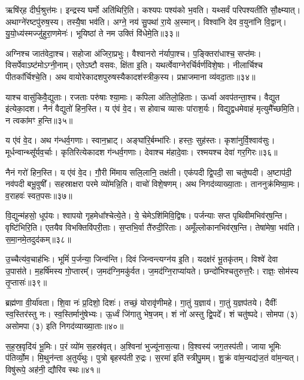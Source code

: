 ऋषि॑र्‌ह दीर्घ॒श्रुत्त॑मः। इन्द्रस्य घर्मो अति॑थिरि॒ति। 
कश्यपः पश्य॑को भ॒वति। यथ्सर्वं परिपश्यती॑ति सौ॒क्ष्म्यात्। 
अथाग्ने॑रष्टपु॑रुष॒स्य। तस्यै॒षा भव॑ति। 
अग्ने॒ नय॑ सु॒पथा॑ रा॒ये अ॒स्मान्। विश्वा॑नि देव व॒युना॑नि वि॒द्वान्। 
यु॒यो॒ध्य॑स्मज्जु॑हुरा॒णमेनः॑। भूयिष्ठां ते नम उक्तिं वि॑धेमे॒ति॥३३॥\anuvakamend


अग्निश्च जात॑वेदा॒श्च। सहोजा अ॑जिरा॒प्रभुः। वैश्वानरो न॑र्यापा॒श्च। 
प॒ङ्क्तिरा॑धाश्च॒ सप्त॑मः। विसर्पेवाऽष्ट॑मोऽग्नी॒नाम्। 
एतेऽष्टौ वसवः, क्षि॑ता इ॒ति। यथर्त्वेवाग्नेरर्चिर्वर्ण॑विशे॒षाः। 
नीलार्चिश्च पीतका᳚र्चिश्चे॒ति। अथ वायोरेकादशपुरुषस्यैका\-दश॑स्त्रीक॒स्य। 
प्रभ्राजमाना व्य॑वदा॒ताः॥३४॥


याश्च वासु॑किवै॒द्युताः। रजताः परु॑षाः श्या॒माः। कपिला अ॑तिलो॒हिताः। 
ऊर्ध्वा अवप॑तन्ता॒श्च। वैद्युत इ॑त्येका॒दश। नैनं वैद्युतो॑ हिन॒स्ति। 
य ए॑वं वे॒द। स होवाच व्यासः पा॑राश॒र्यः। 
विद्युद्वधमेवाहं मृत्युमै᳚च्छमि॒ति। न त्वका॑मꣳ ह॒न्ति॥३५॥


य ए॑वं वे॒द। अथ ग॑न्धर्व॒गणाः। स्वान॒भ्राट्। 
अङ्घा॑रि॒र्बम्भा॑रिः। हस्तः॒ सुह॑स्तः। कृशा॑नुर्वि॒श्वाव॑सुः। 
मूर्धन्वान्थ्सू᳚र्यव॒र्चाः। कृतिरित्येका\-दश ग॑न्धर्व॒\-गणाः। 
देवाश्च म॑हादे॒वाः। रश्मयश्च देवा॑ गर॒गिरः॥३६॥


नैनं गरो॑ हिन॒स्ति। य ए॑वं वे॒द। 
गौ॒री मि॑माय सलि॒लानि॒ तक्ष॑ती। एक॑पदी द्वि॒पदी॒ सा चतु॑ष्पदी। 
अ॒ष्टाप॑दी॒ नव॑पदी बभू॒वुषी᳚। सहस्राक्षरा परमे व्यो॑मन्नि॒ति। 
वाचो॑ विशे॒षणम्। अथ निगद॑व्याख्या॒ताः। 
ताननुक्र॑मिष्या॒मः। व॒राहवः॑ स्वत॒पसः॥३७॥

वि॒द्युन्म॑हसो॒ धूप॑यः। श्वापयो गृहमेधा᳚श्चेत्ये॒ते। 
ये॒ चेमे\-ऽ\-शि॑मिवि॒\-द्विषः। पर्जन्याः सप्त पृथिवीमभिव॑र्‌ष॒न्ति। 
वृष्टि॑भिरि॒ति। एतयैव विभक्तिवि॑परी॒ताः। स॒प्तभि॒र्वा तै॑रुदी॒रिताः। 
अमूँल्लोकान\-भिव॑र्‌ष॒न्ति। तेषा॑मेषा॒ भव॑ति। स॒मा॒न\-मे॒त\-दुद॑कम्॥३८॥

उ॒च्चैत्य॑व॒चाह॑भिः। भूमिं॑ प॒र्जन्या॒ जिन्व॑न्ति। दिवं जिन्वन्त्यग्न॑य इ॒ति। 
यदक्ष॑रं भू॒तकृ॑तम्। विश्वे॑ देवा उ॒पास॑ते। म॒हर्\mbox{}षि॑मस्य गो॒प्तारम्᳚। 
ज॒मद॑ग्नि॒मकु॑र्वत। ज॒मद॑ग्नि॒\-राप्या॑यते। 
छन्दो॑भिश्चतुरुत्त॒रैः। राज्ञः॒ सोम॑स्य तृ॒प्तासः॑॥३९॥

ब्रह्म॑णा वी॒र्या॑वता। शि॒वा नः॑ प्र॒दिशो॒ दिशः॑। 
तच्छं॒ योरावृ॑णीमहे। गा॒तुं य॒ज्ञाय॑। गा॒तुं य॒ज्ञप॑तये। 
दैवीः᳚ स्व॒स्तिर॑स्तु नः। स्व॒स्तिर्मानु॑षेभ्यः। ऊ॒र्ध्वं जि॑गातु भेष॒जम्। 
शं नो॑ अस्तु द्वि॒पदे᳚। शं चतु॑ष्पदे। 
सोमपा (३) असोमपा (३) इति निगद॑व्याख्या॒ताः॥४०॥\anuvakamend


स॒ह॒स्र॒वृदि॑यं भू॒मिः। प॒रं व्यो॑म स॒हस्र॑वृत्। अ॒श्विना॑ भुज्यू॑नास॒त्या। 
वि॒श्वस्य॑ जग॒तस्प॑ती। जाया भूमिः प॑तिर्व्यो॒म। मि॒थुन॑न्ता अ॒तुर्य॑थुः। 
पुत्रो बृहस्प॑ती रु॒द्रः। स॒रमा॑ इति॑ स्त्रीपु॒मम्। 
शु॒क्रं वा॑म॒न्यद्य॑ज॒तं वा॑म॒न्यत्। विषु॑रूपे॒ अह॑नी॒ द्यौरि॑व स्थः॥४१॥



